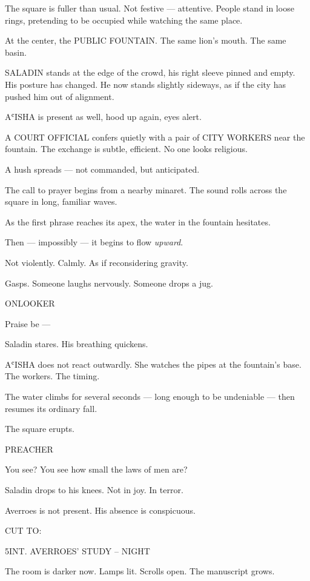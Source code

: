 \documentclass[12pt]{article}
\newlength{\charindent}
\newlength{\dialogueindent}
\newlength{\dialoguewidth}
\newlength{\transitionindent}
\newcommand{\slug}[1]{%
  \needspace{4\baselineskip}%
  \vspace{1.5em}%
  \noindent\MakeUppercase{#1}%
  \nopagebreak[4]%
  \par\vspace{0.75em}%
}
\newcommand{\action}[1]{%
  \noindent#1\par\vspace{0.75em}%
}
\newcommand{\character}[1]{%
  \needspace{3\baselineskip}%
  \par\vspace{0.5em}%
  \noindent\hspace*{\charindent}\MakeUppercase{#1}\nopagebreak[4]%
}
\newcommand{\dialogue}[1]{%
  \par\nobreak\nopagebreak[4]%
  \noindent\hspace*{\dialogueindent}%
  \begin{minipage}[t]{\dialoguewidth}
  #1
  \end{minipage}%
  \par\vspace{0.5em}%
}
\newcommand{\transition}[1]{%
  \needspace{2\baselineskip}%
  \par\vspace{1em}%
  \noindent\hspace*{\transitionindent}\MakeUppercase{#1}%
  \par%
}
\begin{document}
\action{The square is fuller than usual. Not festive — attentive. People stand in loose rings, pretending to be occupied while watching the same place.}

\action{At the center, the PUBLIC FOUNTAIN. The same lion’s mouth. The same basin.}

\action{SALADIN stands at the edge of the crowd, his right sleeve pinned and empty. His posture has changed. He now stands slightly sideways, as if the city has pushed him out of alignment.}

\action{AʿISHA is present as well, hood up again, eyes alert.}

\action{A COURT OFFICIAL confers quietly with a pair of CITY WORKERS near the fountain. The exchange is subtle, efficient. No one looks religious.}

\action{A hush spreads — not commanded, but anticipated.}

\action{The call to prayer begins from a nearby minaret. The sound rolls across the square in long, familiar waves.}

\action{As the first phrase reaches its apex, the water in the fountain hesitates.}

\action{Then — impossibly — it begins to flow \emph{upward}.}

\action{Not violently. Calmly. As if reconsidering gravity.}

\action{Gasps. Someone laughs nervously. Someone drops a jug.}

\character{ONLOOKER}
\dialogue{Praise be —}

\action{Saladin stares. His breathing quickens.}

\action{AʿISHA does not react outwardly. She watches the pipes at the fountain’s base. The workers. The timing.}

\action{The water climbs for several seconds — long enough to be undeniable — then resumes its ordinary fall.}

\action{The square erupts.}

\character{PREACHER}
\dialogue{You see? You see how small the laws of men are?}

\action{Saladin drops to his knees. Not in joy. In terror.}

\action{Averroes is not present. His absence is conspicuous.}

\transition{CUT TO:}

\slug{5\quad INT. AVERROES' STUDY -- NIGHT}

\action{The room is darker now. Lamps lit. Scrolls open. The manuscript grows.}
\end{document}
